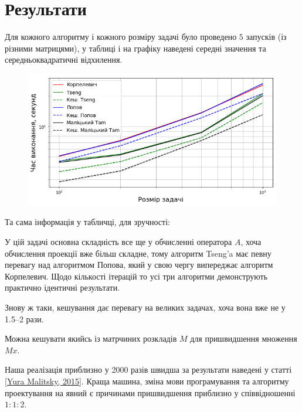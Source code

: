 \section{Результати}

Для кожного алгоритму і кожного розміру задачі було проведено $5$ запусків (із різними матрицями), у таблиці і на графіку наведені середні значення та середньоквадратичні відхилення.

\begin{figure}[H]
    \centering
    \includegraphics[width=.75\textwidth]{img/2/time.png}
\end{figure}

Та сама інформація у табличці, для зручності:



У цій задачі основна складність все ще у обчисленні оператора $A$, %
хоча обчислення проекції вже більш складне, %
тому алгоритм Tseng'a має певну перевагу над алгоритмом Попова, який у свою чергу випереджає алгоритм Корпелевич. Щодо кількості ітерацій то усі три алгоритми демонструють практично ідентичні результати.



Знову ж таки, кешування дає перевагу на великих задачах, хоча вона вже не у 1.5--2 рази. \medskip

\begin{remark}
    Можна кешувати якийсь із матрчиних розкладів $M$ для пришвидшення множення $M x$. 
\end{remark}

\begin{remark}
    Наша реалізація приблизно у 2000 разів швидша за результати наведені у статті \href{https://arxiv.org/abs/1502.04968v1}{[Yura Malitsky, 2015]}. Краща машина, зміна мови програмування та алгоритму проектування на явний є причинами пришвидшення приблизно у співвідношенні $1 : 1 : 2$. 
\end{remark}